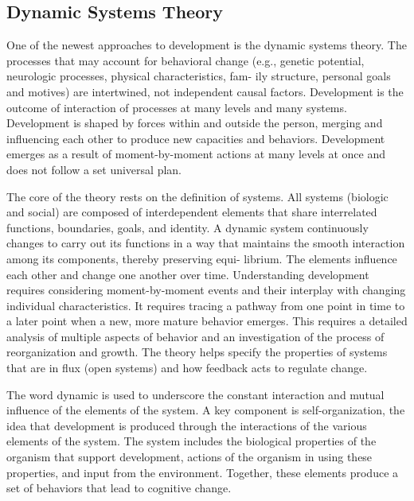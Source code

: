 \subsection{Dynamic Systems Theory}
One of the newest approaches to development is the dynamic systems theory. The
processes that may account for behavioral change (e.g., genetic potential,
neurologic processes, physical characteristics, fam- ily structure, personal
goals and motives) are intertwined, not independent causal factors. Development
is the outcome of interaction of processes at many levels and many systems.
Development is shaped by forces within and outside the person, merging and
influencing each other to produce new capacities and behaviors. Development
emerges as a result of moment-by-moment actions at many levels at once and does
not follow a set universal plan. \cite{Newman2020}

The core of the theory rests on the definition of systems. All systems
(biologic and social) are composed of interdependent elements that share
interrelated functions, boundaries, goals, and identity. A dynamic system
continuously changes to carry out its functions in a way that maintains the
smooth interaction among its components, thereby preserving equi- librium. The
elements influence each other and change one another over time. Understanding
development requires considering moment-by-moment events and their interplay
with changing individual characteristics. It requires tracing a pathway from
one point in time to a later point when a new, more mature behavior emerges.
This requires a detailed analysis of multiple aspects of behavior and an
investigation of the process of reorganization and growth. The theory helps
specify the properties of systems that are in flux (open systems) and how
feedback acts to regulate change. \cite{Feldman3}

The word dynamic is used to underscore the constant interaction and mutual
influence of the elements of the system. A key component is self-organization,
the idea that development is produced through the interactions of the various
elements of the system. The system includes the biological properties of the
organism that support development, actions of the organism in using these
properties, and input from the environment. Together, these elements produce a
set of behaviors that lead to cognitive change. \cite{Gauvain2022}
